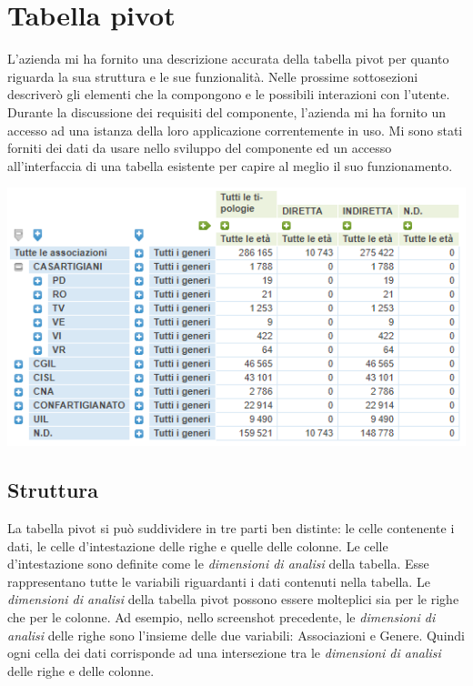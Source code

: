 \section{Tabella pivot}
L'azienda mi ha fornito una descrizione accurata della tabella pivot per quanto riguarda la sua struttura e le sue funzionalità. Nelle prossime sottosezioni descriverò gli elementi che la compongono e le possibili interazioni con l'utente. \\
Durante la discussione dei requisiti del componente, l'azienda mi ha fornito un accesso ad una istanza della loro applicazione correntemente in uso. Mi sono stati forniti dei dati da usare nello sviluppo del componente ed un accesso all'interfaccia di una tabella esistente per capire al meglio il suo funzionamento. \\
\begin{minipage}{\linewidth}
\includegraphics[scale=0.75]{./immagini/tabella-pivot-old.png}
\end{minipage}

\subsection{Struttura}
La tabella pivot si può suddividere in tre parti ben distinte: le celle contenente i dati, le celle d'intestazione delle righe e quelle delle colonne. 
Le celle d'intestazione sono definite come le \emph{dimensioni di analisi} della tabella. Esse rappresentano tutte le variabili riguardanti i dati contenuti nella tabella. Le \emph{dimensioni di analisi} della tabella pivot possono essere molteplici sia per le righe che per le colonne. Ad esempio, nello screenshot precedente, le \emph{dimensioni di analisi} delle righe sono l'insieme delle due variabili: Associazioni e Genere. Quindi ogni cella dei dati corrisponde ad una intersezione tra le \emph{dimensioni di analisi} delle righe e delle colonne.

